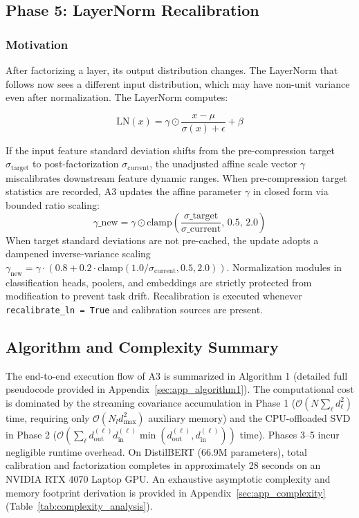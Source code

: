 \subsection{Phase 5: LayerNorm Recalibration}
\label{sec:layernorm_recalibration}

\subsubsection{Motivation}

After factorizing a layer, its output distribution changes. The LayerNorm 
that follows now sees a different input distribution, which may have 
non-unit variance even after normalization. The LayerNorm computes:

\[
\text{LN}(x) = \gamma \odot \frac{x - \mu}{\sigma(x) + \epsilon} + \beta
\tag{4.12}
\]

If the input feature standard deviation shifts from the pre-compression target $\sigma_{\mathrm{target}}$ to post-factorization $\sigma_{\mathrm{current}}$, the unadjusted affine scale vector $\gamma$ miscalibrates downstream feature dynamic ranges. When pre-compression target statistics are recorded, A3 updates the affine parameter $\gamma$ in closed form via bounded ratio scaling:
\[
\gamma\_{\mathrm{new}} = \gamma \odot \mathrm{clamp}\!\left(\frac{\sigma\_{\mathrm{target}}}{\sigma\_{\mathrm{current}}},\, 0.5,\, 2.0\right)
\tag{4.13}
\]
When target standard deviations are not pre-cached, the update adopts a dampened inverse-variance scaling $\gamma_{\mathrm{new}} = \gamma \cdot (0.8 + 0.2 \cdot \mathrm{clamp}(1.0/\sigma_{\mathrm{current}}, 0.5, 2.0))$. Normalization modules in classification heads, poolers, and embeddings are strictly protected from modification to prevent task drift. Recalibration is executed whenever \texttt{recalibrate\_ln = True} and calibration sources are present.

\subsection{Algorithm and Complexity Summary}

The end-to-end execution flow of A3 is summarized in Algorithm 1 (detailed full pseudocode provided in Appendix~\ref{sec:app_algorithm1}). The computational cost is dominated by the streaming covariance accumulation in Phase 1 ($\mathcal{O}(N \sum_\ell d_\ell^2)$ time, requiring only $\mathcal{O}(N_l d_\text{max}^2)$ auxiliary memory) and the CPU-offloaded SVD in Phase 2 ($\mathcal{O}(\sum_\ell d_\text{out}^{(\ell)} d_\text{in}^{(\ell)} \min(d_\text{out}^{(\ell)}, d_\text{in}^{(\ell)}))$ time). Phases 3--5 incur negligible runtime overhead. On DistilBERT (66.9M parameters), total calibration and factorization completes in approximately 28 seconds on an NVIDIA RTX 4070 Laptop GPU. An exhaustive asymptotic complexity and memory footprint derivation is provided in Appendix~\ref{sec:app_complexity} (Table~\ref{tab:complexity_analysis}).

